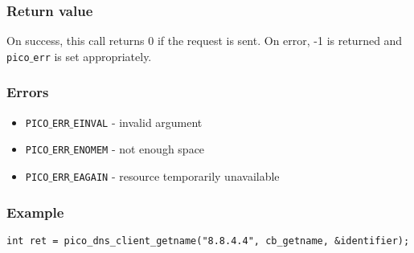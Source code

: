 \subsubsection*{Return value}
On success, this call returns 0 if the request is sent.
On error, -1 is returned and \texttt{pico$\_$err} is set appropriately.

\subsubsection*{Errors}
\begin{itemize}[noitemsep]
\item \texttt{PICO$\_$ERR$\_$EINVAL} - invalid argument
\item \texttt{PICO$\_$ERR$\_$ENOMEM} - not enough space
\item \texttt{PICO$\_$ERR$\_$EAGAIN} - resource temporarily unavailable
\end{itemize}

\subsubsection*{Example}
\begin{verbatim}
int ret = pico_dns_client_getname("8.8.4.4", cb_getname, &identifier);
\end{verbatim}